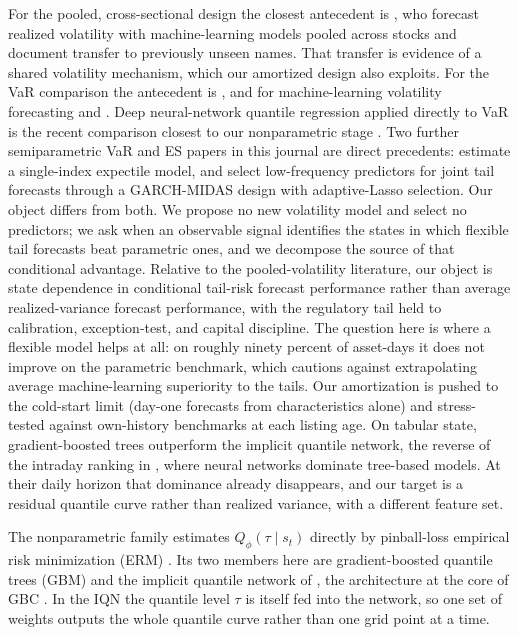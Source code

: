 \documentclass[11pt]{article}
\theoremstyle{remark}
\begin{document}
For the pooled, cross-sectional design the closest antecedent is
\citet{zhang2024commonality}, who forecast realized volatility with
machine-learning models pooled across stocks and document transfer to previously unseen names. That transfer is evidence of a shared volatility mechanism, which our amortized design also exploits. For the VaR comparison the antecedent is \citet{kuester2006}, and for machine-learning volatility forecasting \citet{bucci2020} and \citet{christensen2023ml}. Deep neural-network quantile regression applied directly to VaR is the recent comparison closest to our nonparametric stage \citep{chronopoulos2024}. Two further semiparametric VaR and ES papers in this journal are direct precedents: \citet{jiang2022singleindex} estimate a single-index expectile model, and \citet{luo2025midas} select low-frequency predictors for joint tail forecasts through a GARCH-MIDAS design with adaptive-Lasso selection. Our object differs from both. We propose no new volatility model and select no predictors; we ask when an observable signal identifies the states in which flexible tail forecasts beat parametric ones, and we decompose the source of that conditional advantage. Relative to the pooled-volatility literature, our object is state dependence in conditional tail-risk forecast performance rather than average realized-variance forecast performance, with the regulatory tail held to calibration, exception-test, and capital discipline. The question here
is where a flexible model helps at all: on roughly ninety percent of
asset-days it does not improve on the parametric benchmark, which cautions
against extrapolating average machine-learning superiority to the tails.
Our amortization is pushed to the cold-start limit (day-one forecasts from characteristics alone) and stress-tested against own-history benchmarks at each listing age. On tabular state, gradient-boosted trees outperform the implicit quantile network, the reverse of the intraday ranking in \citet{zhang2024commonality}, where neural networks dominate tree-based models. At their daily horizon that dominance already disappears, and our target is a residual quantile curve rather than realized variance, with a different feature set.

The nonparametric family estimates $Q_\phi(\tau \mid s_t)$ directly by pinball-loss empirical risk minimization (ERM) \citep{koenker1978, steinwart2011}. Its two members here are gradient-boosted quantile trees (GBM) \citep{friedman2001, meinshausen2006} and the implicit quantile network of \citet{dabney2018iqn}, the architecture at the core of GBC \citep{polson2023gbc, nareklishvili2025gqbp}. In the IQN the quantile level $\tau$ is itself fed into the network, so one set of weights outputs the whole quantile curve rather than one grid point at a time.
\end{document}
